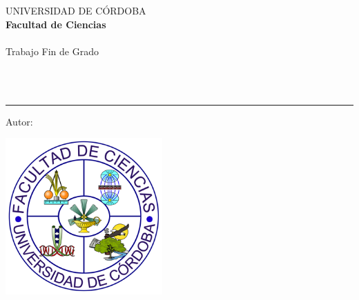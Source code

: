 \AddToShipoutPicture*{\BackgroundPic}
\begin{titlepage}
\begin{center}
\Large UNIVERSIDAD DE CÓRDOBA\\[0.5 cm]
\large  \textbf{Facultad de Ciencias}\\[1.25 cm]
\large \textbf{\titulacion}\\[1.25 cm]
\Large  Trabajo Fin de Grado\\[2.25 cm]
\Huge   \titulo
\end{center}
\vspace{1.25cm}
\\[0.3cm]
\\[0.5cm]
{\color{blue}\hrule}
\vspace{0.5cm}
\noindent \Large{Autor: \autor}
\vfill
\begin{center}
 \includegraphics[width=6cm]{img/logo_ciencias.png}
\end{center}
\vfill
\rightline{\fecha}
\end{titlepage}
